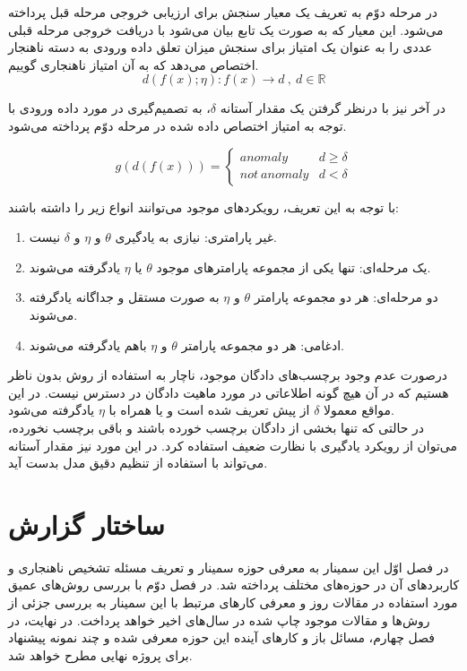 \documentclass[12pt,a4paper]{report}
\theoremstyle{definition}
\theoremstyle{definition}
\begin{document}
در مرحله دوّم به تعریف یک معیار سنجش برای ارزیابی خروجی مرحله قبل پرداخته می‌شود. این معیار که به صورت یک تابع بیان می‌شود با دریافت خروجی مرحله قبلی عددی را به عنوان یک امتیاز برای سنجش میزان تعلق داده ورودی به دسته ناهنجار اختصاص می‌دهد که به آن امتیاز ناهنجاری گوییم.
\begin{equation}
d(f(x);\eta): f(x) \rightarrow d \  ,\  d \in \mathbb{R}
\end{equation}

در آخر نیز با درنظر گرفتن یک مقدار آستانه $\delta$، به تصمیم‌گیری در مورد داده ورودی با توجه به امتیاز اختصاص داده شده در مرحله دوّم پرداخته می‌شود.

\begin{equation}
g(d(f(x))) = 
\left\{
	\begin{array}{ll}
		anomaly  & d \geq \delta \\
		not\ anomaly & d < \delta
	\end{array}
\right.
\end{equation}

با توجه به این تعریف، رویکرد‌های موجود می‌توانند انواع زیر را داشته باشند:
\begin{enumerate}
	\item {غیر پارامتری: نیازی به یادگیری $\theta$ و $\eta$ و $\delta$ نیست.}
	\item{یک مرحله‌ای: تنها یکی از مجموعه پارامترهای موجود $\theta$ یا  $\eta$ یاد‌گرفته می‌شوند.}
	\item{دو مرحله‌ای:‌ هر دو مجموعه پارامتر $\theta$ و $\eta$ به صورت مستقل و جداگانه یاد‌گرفته می‌شوند.}
	\item{ادغامی: هر دو مجموعه پارامتر $\theta$ و $\eta$ باهم یادگرفته می‌شوند. }
\end{enumerate}

درصورت عدم وجود برچسب‌های دادگان موجود، ناچار به استفاده از روش بدون ناظر هستیم که در آن هیچ گونه اطلاعاتی در مورد ماهیت دادگان در دسترس نیست. در  این مواقع معمولا $\delta$ از پیش تعریف شده است و یا همراه با  $\eta$ یادگرفته می‌شود.\\
در حالتی که تنها بخشی از دادگان برچسب خورده باشند و باقی برچسب نخورده، می‌توان از رویکرد یادگیری با نظارت ضعیف استفاده کرد. در این مورد نیز مقدار آستانه می‌تواند با استفاده از تنظیم دقیق مدل بدست آید.
\section{ساختار گزارش}
در فصل اوّل این سمینار به معرفی حوزه سمینار و تعریف مسئله تشخیص ناهنجاری و کاربرد‌های آن در حوزه‌های مختلف پرداخته شد. در فصل دوّم  با بررسی روش‌های عمیق مورد استفاده در مقالات روز و معرفی کار‌های مرتبط با این سمینار به بررسی جزئی از روش‌ها و مقالات موجود چاپ شده در سال‌های اخیر خواهد پرداخت. در نهایت، در فصل چهارم، مسائل باز و کار‌های آینده این حوزه معرفی شده و چند نمونه پیشنهاد برای پروژه نهایی مطرح خواهد شد.
\end{document}
